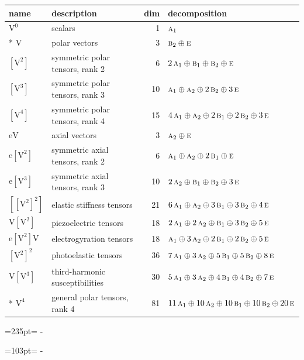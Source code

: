 \documentclass[10pt,a4paper]{article}
\newcommand{\needspace}[1]{\par\penalty-100\begingroup\dimen0=#1\relax\dimen2=\pagegoal
  \advance\dimen2-\pagetotal\ifdim\dimen0>\dimen2\relax\ifdim\dimen2>0pt\vfil\break\fi\fi
  \endgroup}
\numberwithin{equation}{section}
\newcommand{\irr}[1]{\text{\normalfont\scshape #1}}
\newcommand{\jahn}[1]{\mathrm{#1}}
\newlength{\fillwidth}\newlength{\cellwidth}\newlength{\colwidth}
\begin{document}
{\begin{longtable}{@{}llr>{\RaggedRight\arraybackslash}p{\fillwidth}@{}}
name & description & dim & decomposition\\\midrule\endhead
\bottomrule\endfoot\endlastfoot
$\jahn{V^{0}}$ & scalars & 1 & $\irr{a}_{1}$\\*
$\jahn{V}$ & polar vectors & 3 & $\irr{b}_{2} \oplus\allowbreak \irr{e}$\\
$\jahn{[V^{2}]}$ & symmetric polar tensors, rank 2 & 6 & $2\,\irr{a}_{1} \oplus\allowbreak \irr{b}_{1} \oplus\allowbreak \irr{b}_{2} \oplus\allowbreak \irr{e}$\\
$\jahn{[V^{3}]}$ & symmetric polar tensors, rank 3 & 10 & $\irr{a}_{1} \oplus\allowbreak \irr{a}_{2} \oplus\allowbreak 2\,\irr{b}_{2} \oplus\allowbreak 3\,\irr{e}$\\
$\jahn{[V^{4}]}$ & symmetric polar tensors, rank 4 & 15 & $4\,\irr{a}_{1} \oplus\allowbreak \irr{a}_{2} \oplus\allowbreak 2\,\irr{b}_{1} \oplus\allowbreak 2\,\irr{b}_{2} \oplus\allowbreak 3\,\irr{e}$\\
$\jahn{eV}$ & axial vectors & 3 & $\irr{a}_{2} \oplus\allowbreak \irr{e}$\\
$\jahn{e[V^{2}]}$ & symmetric axial tensors, rank 2 & 6 & $\irr{a}_{1} \oplus\allowbreak \irr{a}_{2} \oplus\allowbreak 2\,\irr{b}_{1} \oplus\allowbreak \irr{e}$\\
$\jahn{e[V^{3}]}$ & symmetric axial tensors, rank 3 & 10 & $2\,\irr{a}_{2} \oplus\allowbreak \irr{b}_{1} \oplus\allowbreak \irr{b}_{2} \oplus\allowbreak 3\,\irr{e}$\\
$\jahn{[[V^{2}]^{2}]}$ & elastic stiffness tensors & 21 & $6\,\irr{a}_{1} \oplus\allowbreak \irr{a}_{2} \oplus\allowbreak 3\,\irr{b}_{1} \oplus\allowbreak 3\,\irr{b}_{2} \oplus\allowbreak 4\,\irr{e}$\\
$\jahn{V[V^{2}]}$ & piezoelectric tensors & 18 & $2\,\irr{a}_{1} \oplus\allowbreak 2\,\irr{a}_{2} \oplus\allowbreak \irr{b}_{1} \oplus\allowbreak 3\,\irr{b}_{2} \oplus\allowbreak 5\,\irr{e}$\\
$\jahn{e[V^{2}]V}$ & electrogyration tensors & 18 & $\irr{a}_{1} \oplus\allowbreak 3\,\irr{a}_{2} \oplus\allowbreak 2\,\irr{b}_{1} \oplus\allowbreak 2\,\irr{b}_{2} \oplus\allowbreak 5\,\irr{e}$\\
$\jahn{[V^{2}]^{2}}$ & photoelastic tensors & 36 & $7\,\irr{a}_{1} \oplus\allowbreak 3\,\irr{a}_{2} \oplus\allowbreak 5\,\irr{b}_{1} \oplus\allowbreak 5\,\irr{b}_{2} \oplus\allowbreak 8\,\irr{e}$\\
$\jahn{V[V^{3}]}$ & third-harmonic susceptibilities & 30 & $5\,\irr{a}_{1} \oplus\allowbreak 3\,\irr{a}_{2} \oplus\allowbreak 4\,\irr{b}_{1} \oplus\allowbreak 4\,\irr{b}_{2} \oplus\allowbreak 7\,\irr{e}$\\*
$\jahn{V^{4}}$ & general polar tensors, rank 4 & 81 & $11\,\irr{a}_{1} \oplus\allowbreak 10\,\irr{a}_{2} \oplus\allowbreak 10\,\irr{b}_{1} \oplus\allowbreak 10\,\irr{b}_{2} \oplus\allowbreak 20\,\irr{e}$\\
\bottomrule\end{longtable}}
\needspace{235pt}
\needspace{103pt}
\end{document}
